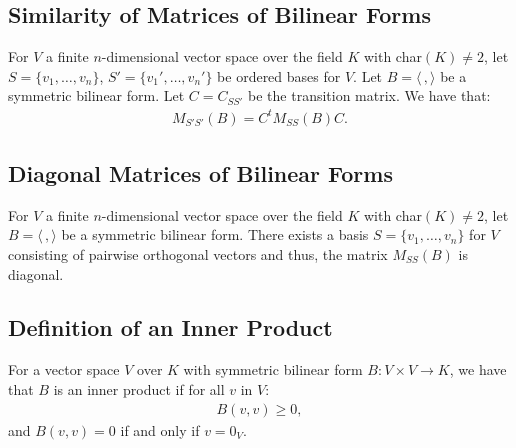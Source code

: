\documentclass[a4paper, 12pt, twoside]{article}
\begin{document}
\subsection{Similarity of Matrices of Bilinear Forms}

For $V$ a finite $n$-dimensional vector space over the field $K$ with char$(K) \neq 2$, 
let $S = \{v_1, \ldots, v_n\}$, $S' = \{v_1', \ldots, v_n'\}$ be
ordered bases for $V$. Let $B = \langle \, , \rangle$ be a symmetric bilinear form.
Let $C = C_{SS'}$ be the transition matrix. We have that: \begin{gather*}
  M_{S'S'}(B) = C^tM_{SS}(B)C.
\end{gather*}

\subsection{Diagonal Matrices of Bilinear Forms}

For $V$ a finite $n$-dimensional vector space over the field $K$ with char$(K) \neq 2$, 
let $B = \langle \, , \rangle$ be a symmetric bilinear form.
There exists a basis $S = \{v_1, \ldots, v_n\}$ for $V$ consisting of pairwise orthogonal
vectors and thus, the matrix $M_{SS}(B)$ is diagonal.

\subsection{Definition of an Inner Product}

For a vector space $V$ over $K$ with symmetric bilinear form $B : V \times V \to K$, we
have that $B$ is an inner product if for all $v$ in $V$: \begin{gather*}
  B(v, v) \geq 0,
\end{gather*} and $B(v, v) = 0$ if and only if $v = 0_V$.
\end{document}
